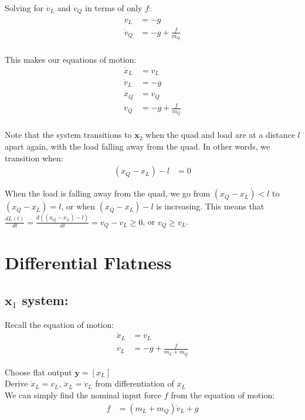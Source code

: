 \documentclass[11pt]{article}
\begin{document}
Solving for $\dot{v}_L$ and $\dot{v}_Q$ in terms of only $f$:
\begin{align*}
\dot{v}_L &= -g \\
\dot{v}_Q &= -g + \frac{f}{m_Q} \\
\end{align*} 

This makes our equations of motion: 
\begin{align*}
\dot{x}_L &= v_L \\
\dot{v}_L &= -g \\ 
\dot{x}_Q &= v_Q \\
\dot{v}_Q &= -g + \frac{f}{m_Q} \\
\end{align*} 


Note that the system transitions to $\mathbf{x}_2$ when the quad and load are at a distance $l$ apart again, with the load falling away from the quad. In other words, we transition when: 
\begin{align*}
(x_Q - x_L) - l &= 0
\end{align*}

When the load is falling away from the quad, we go from $(x_Q - x_L) < l$ to $(x_Q - x_L) = l$, or when $(x_Q - x_L)-l$ is increasing. This means that $\frac{dL(t)}{dt} = \frac{d ((x_Q - x_L)-l) }{dt} = v_Q-v_L \ge 0$, or $v_Q \ge v_L$. 






\newpage
\section{Differential Flatness} 
\subsection{$\mathbf{x}_1$ system:} 

Recall the equation of motion: 
\begin{align*}
\dot{x}_L &= v_L \\
\dot{v}_L &= -g +\frac{f}{m_L+m_Q}
\end{align*}




Choose flat output $\mathbf{y} = [{x}_L]$  \\

\mbox{} \newline
Derive $\dot{x}_L = v_{L}$, $\ddot{x}_L = \dot{v}_{L}$ from differentiation of $x_L$ \\
We can simply find the nominal input force $f$ from the equation of motion:
\begin{align*}
f &= (m_L+m_Q) \dot{v}_L + g
\end{align*}
\end{document}
